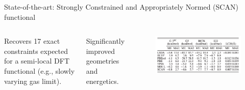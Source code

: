 \documentclass[aspectratio=169]{beamer}
\begin{document}
    \begin{frame}{State-of-the-art: Strongly Constrained and Appropriately Normed (SCAN) functional}

        \begin{columns}
            Recovers 17 exact constraints expected for a semi-local DFT functional (e.g., slowly varying gas limit).\cite{sunStronglyConstrainedAppropriately2015}

            Significantly improved geometries and energetics.\cite{sunAccurateFirstprinciplesStructures2016}
            \begin{figure}
                \centering
                \includegraphics[width=0.8\linewidth]{lectures/figures/6_scan_performance.png}
            \end{figure}


\end{columns}
\end{frame}
\end{document}

